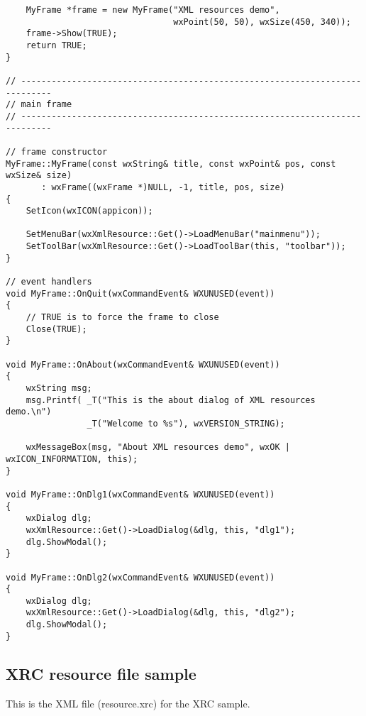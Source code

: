 \begin{verbatim}
    MyFrame *frame = new MyFrame("XML resources demo",
                                 wxPoint(50, 50), wxSize(450, 340));
    frame->Show(TRUE);
    return TRUE;
}

// ----------------------------------------------------------------------------
// main frame
// ----------------------------------------------------------------------------

// frame constructor
MyFrame::MyFrame(const wxString& title, const wxPoint& pos, const wxSize& size)
       : wxFrame((wxFrame *)NULL, -1, title, pos, size)
{
    SetIcon(wxICON(appicon));

    SetMenuBar(wxXmlResource::Get()->LoadMenuBar("mainmenu"));
    SetToolBar(wxXmlResource::Get()->LoadToolBar(this, "toolbar"));
}

// event handlers
void MyFrame::OnQuit(wxCommandEvent& WXUNUSED(event))
{
    // TRUE is to force the frame to close
    Close(TRUE);
}

void MyFrame::OnAbout(wxCommandEvent& WXUNUSED(event))
{
    wxString msg;
    msg.Printf( _T("This is the about dialog of XML resources demo.\n")
                _T("Welcome to %s"), wxVERSION_STRING);

    wxMessageBox(msg, "About XML resources demo", wxOK | wxICON_INFORMATION, this);
}

void MyFrame::OnDlg1(wxCommandEvent& WXUNUSED(event))
{
    wxDialog dlg;
    wxXmlResource::Get()->LoadDialog(&dlg, this, "dlg1");
    dlg.ShowModal();
}

void MyFrame::OnDlg2(wxCommandEvent& WXUNUSED(event))
{
    wxDialog dlg;
    wxXmlResource::Get()->LoadDialog(&dlg, this, "dlg2");
    dlg.ShowModal();
}
\end{verbatim}

\subsection{XRC resource file sample}\label{xrcsample}

This is the XML file (resource.xrc) for the XRC sample.

